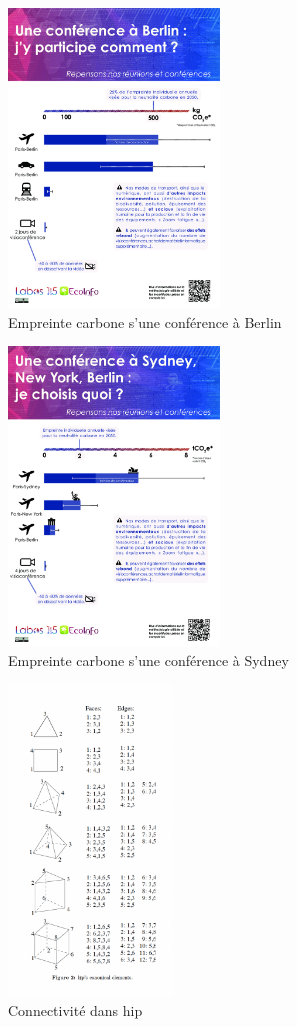 \begin{figure}[H]
    \centering
    \includegraphics[width=0.5\textwidth]{images/berlin_v7_fr.png}
    \caption{Empreinte carbone s'une conférence à Berlin}
    \label{fig:berlin}
\end{figure}

\begin{figure}[H]
    \centering
    \includegraphics[width=0.5\textwidth]{images/sydney_v7_fr.png}
    \caption{Empreinte carbone s'une conférence à Sydney}
    \label{fig:sydney}
\end{figure}

\newpage

\begin{figure}[H]
    \centering
    \includegraphics[width=0.39\textwidth]{images/Connectivite_hip.png}
    \caption{Connectivité dans hip}
    \label{fig:ordre_connect}
\end{figure}
